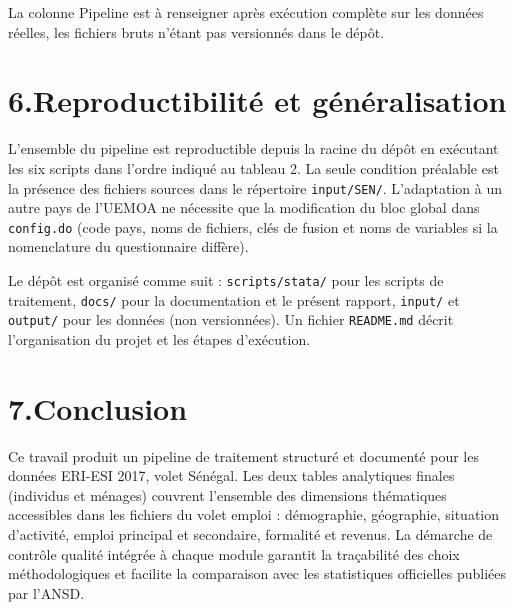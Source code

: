 \documentclass[12pt,a4paper]{article}
\begin{document}
La colonne \og Pipeline \fg{} est à renseigner après exécution complète sur les
données réelles, les fichiers bruts n'étant pas versionnés dans le dépôt.

\section*{6.\quad Reproductibilité et généralisation}

L'ensemble du pipeline est reproductible depuis la racine du dépôt en exécutant
les six scripts dans l'ordre indiqué au tableau 2. La seule condition préalable
est la présence des fichiers sources dans le répertoire \texttt{input/SEN/}.
L'adaptation à un autre pays de l'UEMOA ne nécessite que la modification du
bloc global dans \texttt{config.do} (code pays, noms de fichiers, clés de
fusion et noms de variables si la nomenclature du questionnaire diffère).

Le dépôt est organisé comme suit : \texttt{scripts/stata/} pour les scripts de
traitement, \texttt{docs/} pour la documentation et le présent rapport,
\texttt{input/} et \texttt{output/} pour les données (non versionnées). Un
fichier \texttt{README.md} décrit l'organisation du projet et les étapes
d'exécution.

\section*{7.\quad Conclusion}

Ce travail produit un pipeline de traitement structuré et documenté pour les
données ERI-ESI 2017, volet Sénégal. Les deux tables analytiques finales
(individus et ménages) couvrent l'ensemble des dimensions thématiques
accessibles dans les fichiers du volet emploi : démographie, géographie,
situation d'activité, emploi principal et secondaire, formalité et revenus.
La démarche de contrôle qualité intégrée à chaque module garantit la traçabilité
des choix méthodologiques et facilite la comparaison avec les statistiques
officielles publiées par l'ANSD.
\end{document}
